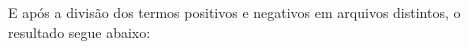 E após a divisão dos termos positivos e negativos em arquivos distintos, o resultado segue abaixo:


\begin{figure}[H]
	
	\center
	\qquad

\end{figure}
